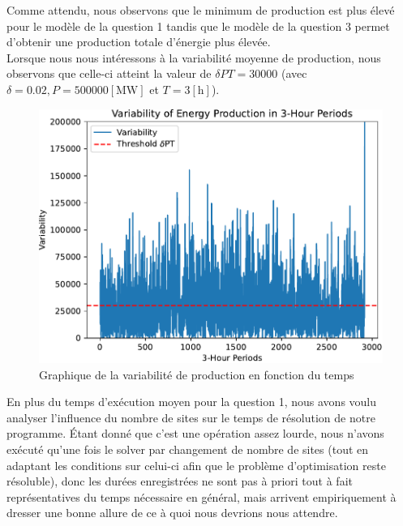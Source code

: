 \documentclass{article}
\newlength{\temp}
\begin{document}
Comme attendu, nous observons que le minimum de production est plus élevé pour le modèle de la question 1 tandis que le modèle de la question 3 permet d'obtenir une production totale d'énergie plus élevée.\\
Lorsque nous nous intéressons à la variabilité moyenne de production, nous observons que celle-ci atteint la valeur de $\delta P T = 30 000$ (avec $\delta = 0.02, P = 500 000 [\mathrm{MW}]$ et $T = 3 [\mathrm{h}]$).\\

\begin{figure}[h!]
    \centering
    \includegraphics[scale=0.5]{Images/Partie_1/Q3/variability_comparison.pdf}
    \caption{Graphique de la variabilité de production en fonction du temps}
    \label{fig:variability_comparison_Q3}
\end{figure}
En plus du temps d'exécution moyen pour la question 1, nous avons voulu analyser l'influence du nombre de sites sur le temps de résolution de notre programme. Étant donné que c'est une opération assez lourde, nous n'avons exécuté qu'une fois le solver par changement de nombre de sites (tout en adaptant les conditions sur celui-ci afin que le problème d'optimisation reste résoluble), donc les durées enregistrées ne sont pas à priori tout à fait représentatives du temps nécessaire en général, mais arrivent empiriquement à dresser une bonne allure de ce à quoi nous devrions nous attendre.
\end{document}
